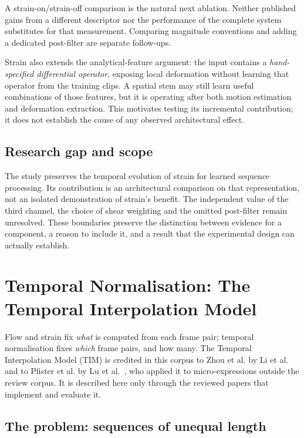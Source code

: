 A strain-on/strain-off comparison is the natural next ablation. Neither published gains from a different descriptor nor the performance of the complete system substitutes for that measurement. Comparing magnitude conventions and adding a dedicated post-filter are separate follow-ups.

Strain also extends the analytical-feature argument: the input contains a \textit{hand-specified differential operator}, exposing local deformation without learning that operator from the training clips. A spatial stem may still learn useful combinations of those features, but it is operating after both motion estimation and deformation extraction. This motivates testing its incremental contribution; it does not establish the cause of any observed architectural effect.

\subsection{Research gap and scope}
\label{sec:strain-gap}

The study preserves the temporal evolution of strain for learned sequence processing. Its contribution is an architectural comparison on that representation, not an isolated demonstration of strain's benefit. The independent value of the third channel, the choice of shear weighting and the omitted post-filter remain unresolved. These boundaries preserve the distinction between evidence for a component, a reason to include it, and a result that the experimental design can actually establish.


\section{Temporal Normalisation: The Temporal Interpolation Model}
\label{sec:tim-review}

Flow and strain fix \textit{what} is computed from each frame pair; temporal normalisation fixes \textit{which} frame pairs, and how many. The Temporal Interpolation Model (TIM) is credited in this corpus to Zhou et al. by Li et al.~\cite{liX2013,liX2018} and to Pfister et al. by Lu et al.~\cite{lu2015}, who applied it to micro-expressions outside the review corpus. It is described here only through the reviewed papers that implement and evaluate it.

\subsection{The problem: sequences of unequal length}
\label{sec:tim-problem}

